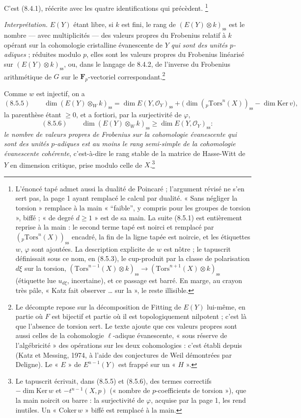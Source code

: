 \documentclass[11pt,a4paper]{article}
\begin{document}
C'est (8.4.1), réécrite avec les quatre identifications qui précèdent.
\footnote{L'énoncé tapé admet aussi la dualité de Poincaré ; l'argument
révisé ne s'en sert pas, la page 1 ayant remplacé le calcul par dualité.
« Sans négliger la torsion » remplace à la main « “faible”, y compris pour
les groupes de torsion », biffé ; « de degré $d \geq 1$ » est de sa main.
La suite (8.5.1) est entièrement reprise à la main : le second terme tapé est
noirci et remplacé par $({}_{p}\mathrm{Tors}^{n}(X))_{\mathrm{ss}}$ encadré,
la fin de la ligne tapée est noircie, et les étiquettes $w$, $\varphi$ sont
ajoutées. La description explicite de $w$ est nôtre ; le tapuscrit définissait
sous ce nom, en (8.5.3), le cup-produit par la classe de polarisation $d\xi$
sur la torsion, $(\mathrm{Tors}^{n-1}(X) \otimes k)_{\mathrm{ss}} \to
(\mathrm{Tors}^{n+1}(X) \otimes k)_{\mathrm{ss}}$ (étiquette lue
$u_{d\xi}$, incertaine), et ce passage est barré. En marge, au crayon très
pâle, « Katz fait observer \ldots{} sur la », le reste illisible.}

\emph{Interprétation.} $E(Y)$ étant libre, si $k$ est fini, le rang de
$(E(Y) \otimes k)_{\mathrm{ss}}$ est le nombre --- avec multiplicités --- des
valeurs propres du Frobenius relatif à $k$ opérant sur la cohomologie
cristalline évanescente de $Y$ \emph{qui sont des unités $p$-adiques} ;
réduites modulo $p$, elles sont les valeurs propres du Frobenius linéarisé
sur $(E(Y) \otimes k)_{\mathrm{ss}}$, ou, dans le langage de 8.4.2, de
l'inverse du Frobenius arithmétique de $G$ sur le
$\mathbf{F}_{p}$-vectoriel correspondant.\footnote{Le décompte repose sur la
décomposition de Fitting de $E(Y)$ lui-même, en partie où $F$ est bijectif et
partie où il est topologiquement nilpotent ; c'est là que l'absence de
torsion sert. Le texte ajoute que ces valeurs propres sont aussi celles de
la cohomologie $\ell$-adique évanescente, « sous réserve de l'algébricité »
des opérations sur les deux cohomologies : c'est établi depuis (Katz et
Messing, 1974, à l'aide des conjectures de Weil démontrées par Deligne). Le
« $E$ » de $E^{n-1}(Y)$ est frappé sur un « $H$ ».}

Comme $w$ est injectif, on a
\[
(8.5.5) \qquad \dim (E(Y) \otimes_{W} k)_{\mathrm{ss}} =
\dim E(Y, \mathcal{O}_{Y})_{\mathrm{ss}} +
\bigl(\dim ({}_{p}\mathrm{Tors}^{n}(X))_{\mathrm{ss}}
- \dim \mathrm{Ker}\, v\bigr) ,
\]
la parenthèse étant $\geq 0$, et a fortiori, par la surjectivité de
$\varphi$,
\[
(8.5.6) \qquad \dim (E(Y) \otimes_{W} k)_{\mathrm{ss}} \geq
\dim E(Y, \mathcal{O}_{Y})_{\mathrm{ss}} :
\]
\emph{le nombre de valeurs propres de Frobenius sur la cohomologie
évanescente qui sont des unités $p$-adiques est au moins le rang semi-simple
de la cohomologie évanescente cohérente}, c'est-à-dire le rang stable de la
matrice de Hasse-Witt de $Y$ en dimension critique, prise modulo celle de
$X$.\footnote{Le tapuscrit écrivait, dans (8.5.5) et (8.5.6), des termes
correctifs $- \dim \mathrm{Ker}\, w$ et $- t^{n-1}(X, p)$ (« nombre de
$p$-coefficients de torsion »), que la main noircit ou barre : la
surjectivité de $\varphi$, acquise par la page 1, les rend inutiles. Un
« $\mathrm{Coker}\, w$ » biffé est remplacé à la main.}
\end{document}
